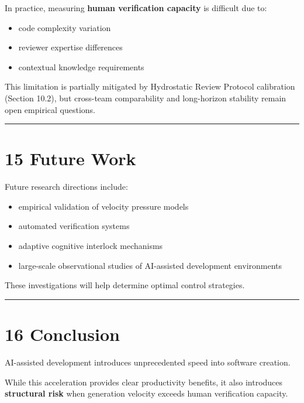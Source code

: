\documentclass[
]{article}
\providecommand{\tightlist}{%
  \setlength{\itemsep}{0pt}\setlength{\parskip}{0pt}}
\begin{document}
In practice, measuring \textbf{human verification capacity} is difficult
due to:

\begin{itemize}
\tightlist
\item
  code complexity variation
\item
  reviewer expertise differences
\item
  contextual knowledge requirements
\end{itemize}

This limitation is partially mitigated by Hydrostatic Review Protocol
calibration (Section 10.2), but cross-team comparability and
long-horizon stability remain open empirical questions.

\begin{center}\rule{0.5\linewidth}{0.5pt}\end{center}

\section{15 Future Work}\label{15-future-work}

Future research directions include:

\begin{itemize}
\tightlist
\item
  empirical validation of velocity pressure models
\item
  automated verification systems
\item
  adaptive cognitive interlock mechanisms
\item
  large-scale observational studies of AI-assisted development
  environments
\end{itemize}

These investigations will help determine optimal control strategies.

\begin{center}\rule{0.5\linewidth}{0.5pt}\end{center}

\section{16 Conclusion}\label{16-conclusion}

AI-assisted development introduces unprecedented speed into software
creation.

While this acceleration provides clear productivity benefits, it also
introduces \textbf{structural risk} when generation velocity exceeds
human verification capacity.
\end{document}
